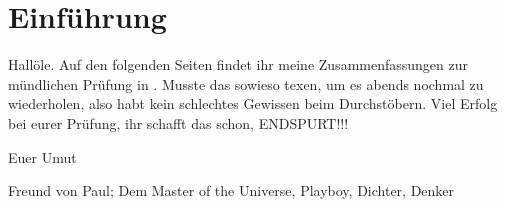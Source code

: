 \chapter{Einführung}
Hallöle.
Auf den folgenden Seiten findet ihr meine Zusammenfassungen zur mündlichen Prüfung in \whichprep.
Musste das sowieso texen, um es abends nochmal zu wiederholen, also habt kein schlechtes Gewissen beim Durchstöbern.
Viel Erfolg bei eurer Prüfung, ihr schafft das schon, ENDSPURT!!!

Euer Umut
\par
Freund von Paul; Dem Master of the Universe, Playboy, Dichter, Denker
